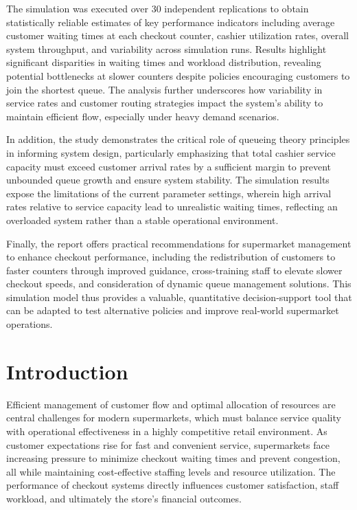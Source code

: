 \documentclass[
]{article}
\begin{document}
The simulation was executed over 30 independent replications to obtain
statistically reliable estimates of key performance indicators including
average customer waiting times at each checkout counter, cashier
utilization rates, overall system throughput, and variability across
simulation runs. Results highlight significant disparities in waiting
times and workload distribution, revealing potential bottlenecks at
slower counters despite policies encouraging customers to join the
shortest queue. The analysis further underscores how variability in
service rates and customer routing strategies impact the system's
ability to maintain efficient flow, especially under heavy demand
scenarios.

In addition, the study demonstrates the critical role of queueing theory
principles in informing system design, particularly emphasizing that
total cashier service capacity must exceed customer arrival rates by a
sufficient margin to prevent unbounded queue growth and ensure system
stability. The simulation results expose the limitations of the current
parameter settings, wherein high arrival rates relative to service
capacity lead to unrealistic waiting times, reflecting an overloaded
system rather than a stable operational environment.

Finally, the report offers practical recommendations for supermarket
management to enhance checkout performance, including the redistribution
of customers to faster counters through improved guidance,
cross-training staff to elevate slower checkout speeds, and
consideration of dynamic queue management solutions. This simulation
model thus provides a valuable, quantitative decision-support tool that
can be adapted to test alternative policies and improve real-world
supermarket operations.

\newpage
    \centering

\section{Introduction}\label{introduction}

\justifying

Efficient management of customer flow and optimal allocation of
resources are central challenges for modern supermarkets, which must
balance service quality with operational effectiveness in a highly
competitive retail environment. As customer expectations rise for fast
and convenient service, supermarkets face increasing pressure to
minimize checkout waiting times and prevent congestion, all while
maintaining cost-effective staffing levels and resource utilization. The
performance of checkout systems directly influences customer
satisfaction, staff workload, and ultimately the store's financial
outcomes.
\end{document}

